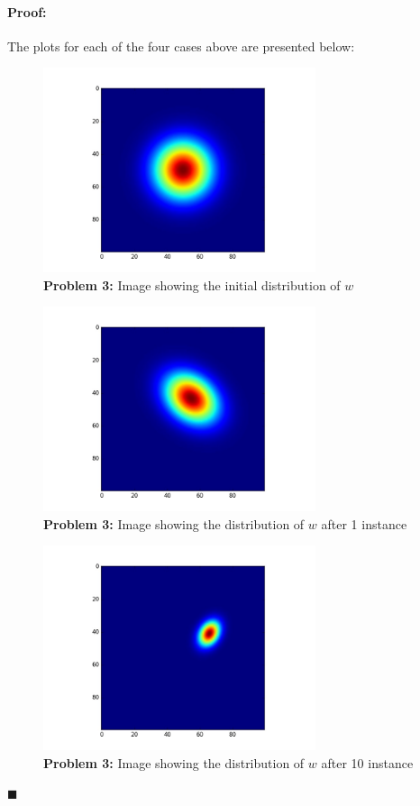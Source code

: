 \documentclass[12pt]{article}
\newenvironment{proof}{\paragraph{Proof: }}{\hfill$\blacksquare$}
\begin{document}
\begin{proof}
\begin{enumerate}
\end{enumerate}

The plots for each of the four cases above are presented below:

\begin{figure}[!htbp]
\centering
\includegraphics[width=8cm]{hw2_p3_w_initial.jpg}
\caption{\textbf{Problem 3:} Image showing the initial distribution of $w$}
\end{figure}

\begin{figure}[!htbp]
\centering
\includegraphics[width=8cm]{hw2_p3_w_1.jpg}
\caption{\textbf{Problem 3:} Image showing the distribution of $w$ after 1 instance}
\end{figure}

\begin{figure}[!htbp]
\centering
\includegraphics[width=8cm]{hw2_p3_w_10.jpg}
\caption{\textbf{Problem 3:} Image showing the distribution of $w$ after 10 instance}
\end{figure}


\end{proof}
\end{document}
